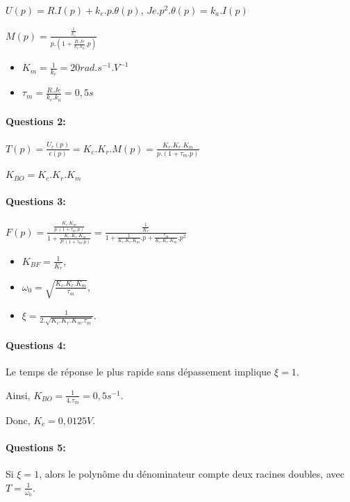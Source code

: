 $U(p)=R.I(p)+k_e.p.\theta(p)$, $Je.p^2.\theta(p)=k_a.I(p)$

$M(p)=\frac{\frac{1}{k_e}}{p.(1+\frac{R.Je}{k_e.k_a}.p)}$

\begin{itemize}
 \item $K_m=\frac{1}{k_e}=20rad.s^{-1}.V^{-1}$
 \item $\tau_m=\frac{R.Je}{k_e.k_a}=0,5s$
\end{itemize}

\paragraph{Questions 2:}

$T(p)=\frac{U_r(p)}{\epsilon(p)}=K_c.K_r.M(p)=\frac{K_c.K_r.K_m}{p.(1+\tau_m.p)}$

$K_{BO}=K_c.K_r.K_m$

\paragraph{Questions 3:}

$F(p)=\frac{\frac{K_c.K_m}{p.(1+\tau_m.p)}}{1+\frac{K_c.K_r.K_m}{P.(1+\tau_m.p)}}=\frac{\frac{1}{K_r}}{1+\frac{1}{K_c.K_r.K_m}.p+\frac{\tau_m}{K_c.K_r.K_m}.p^2}$

\begin{itemize}
 \item $K_{BF}=\frac{1}{K_r}$,
 \item $\omega_0=\sqrt{\frac{K_c.K_r.K_m}{\tau_m}}$,
 \item $\xi=\frac{1}{2.\sqrt{K_c.K_r.K_m.\tau_m}}$.
\end{itemize}

\paragraph{Questions 4:}

Le temps de réponse le plus rapide sans dépassement implique $\xi=1$.

Ainsi, $K_{BO}=\frac{1}{4.\tau_m}=0,5s^{-1}$.

Donc, $K_c=0,0125V$.

\paragraph{Questions 5:}

Si $\xi=1$, alors le polynôme du dénominateur compte deux racines doubles, avec  $T=\frac{1}{\omega_0}$.

